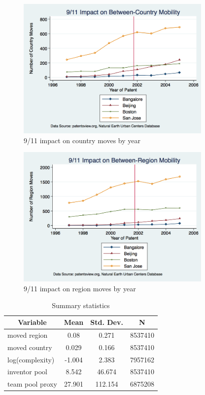 \documentclass[12pt]{article}
\begin{document}
\newpage
\begin{figure}[h!]
\begin{centering}
  \includegraphics[width=0.85\textwidth]{countrymoves911}
  \caption{9/11 impact on country moves by year}
   \label{fig:countrymoves911}
\end{centering}
\end{figure}

\begin{figure}[h!]
\begin{centering}
  \includegraphics[width=0.85\textwidth]{regionmoves911}
  \caption{9/11 impact on region moves by year}
   \label{fig:regionmoves911}
\end{centering}
\end{figure}

\newpage
\begin{table}[htbp]\centering \caption{Summary statistics \label{sumstat}}
\begin{tabular}{l c c  c}\hline\hline
\multicolumn{1}{c}{\textbf{Variable}} & \textbf{Mean}
 & \textbf{Std. Dev.} & \textbf{N}\\ \hline
moved region & 0.08 & 0.271  & 8537410\\
moved country & 0.029 & 0.166  & 8537410\\
log(complexity) & -1.004 & 2.383  & 7957162\\
inventor pool & 8.542 & 46.674  & 8537410\\
team pool proxy& 27.901 & 112.154  & 6875208\\
\hline
\end{tabular}
\end{table}
\end{document}
